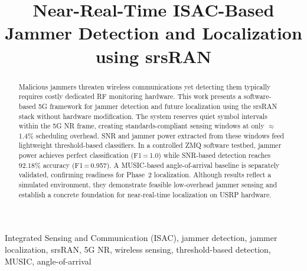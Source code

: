 \documentclass[conference]{IEEEtran}
\begin{document}
\title{Near-Real-Time ISAC-Based Jammer Detection and Localization using srsRAN\\}

\author{
\and
{}
\and
{}
}

\maketitle

\begin{abstract}
Malicious jammers threaten wireless communications yet detecting them
typically requires costly dedicated RF monitoring hardware. This work
presents a software-based 5G framework for jammer detection and future
localization using the srsRAN stack without hardware modification. The
system reserves quiet symbol intervals within the 5G NR frame, creating
standards-compliant sensing windows at only $\approx$1.4\% scheduling
overhead. SNR and jammer power extracted from these windows feed
lightweight threshold-based classifiers. In a controlled ZMQ software
testbed, jammer power achieves perfect classification (F1\,=\,1.0) while
SNR-based detection reaches 92.18\% accuracy (F1\,=\,0.957). A
MUSIC-based angle-of-arrival baseline is separately validated, confirming
readiness for Phase~2 localization. Although results reflect a simulated
environment, they demonstrate feasible low-overhead jammer sensing and
establish a concrete foundation for near-real-time localization on USRP
hardware.
\end{abstract}

\begin{IEEEkeywords}
Integrated Sensing and Communication (ISAC), jammer detection, jammer
localization, srsRAN, 5G NR, wireless sensing, threshold-based detection,
MUSIC, angle-of-arrival
\end{IEEEkeywords}
\end{document}
